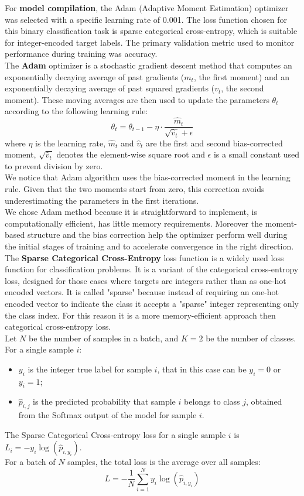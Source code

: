 \documentclass[10pt]{article}
\begin{document}
For \textbf{model compilation}, the Adam (Adaptive Moment Estimation) optimizer was selected with a specific learning rate of 0.001. The loss function chosen for this binary classification task is sparse categorical cross-entropy, which is suitable for integer-encoded target labels. The primary validation metric used to monitor performance during training was accuracy. \\

The \textbf{Adam} optimizer is a stochastic gradient descent method that computes an exponentially decaying average of past gradients ($m_t$, the first moment) and an exponentially decaying average of past squared gradients ($v_t$, the second moment). These moving averages are then used to update the parameters $\theta_t$ according to the following learning rule: 
$$\theta_t = \theta_{t-1} - \eta \cdot \frac{\hat{m}_t}{\sqrt{\hat{v}_t} + \epsilon}$$
where $\eta$ is the learning rate, $\hat{m}_t$ and $\hat{v}_t$ are the first and second bias-corrected moment, $\sqrt{\hat{v}_t}$ denotes the element-wise square root and $\epsilon$ is a small constant used to prevent division by zero. \\
We notice that Adam algorithm uses the bias-corrected moment in the learning rule. Given that the two moments start from zero, this correction avoids underestimating the parameters in the first iterations.\\
We chose Adam method because it is straightforward to implement, is computationally efficient, has little memory requirements. Moreover the moment-based structure and the bias correction help the optimizer perform well during the initial stages of training and to accelerate convergence in the right direction. \\

The \textbf{Sparse Categorical Cross-Entropy} loss function is a widely used loss function for classification problems. It is a variant of the categorical cross-entropy loss, designed for those cases where targets are integers rather than as one-hot encoded vectors. It is called "sparse" because instead of requiring an one-hot encoded vector to indicate the class it accepts a "sparse" integer representing only the class index. For this reason it is a more memory-efficient approach then categorical cross-entropy loss. \\
Let $N$ be the number of samples in a batch, and $K = 2$ be the number of classes.
For a single sample $i$:
\begin{itemize}
    \item $y_i$ is the integer true label for sample $i$, that in this case can be $y_i = 0$ or $y_i = 1$;
    \item $\hat{p}_{i, j}$ is the predicted probability that sample $i$ belongs to class $j$, obtained from the Softmax output of the model for sample $i$.
\end{itemize}
The Sparse Categorical Cross-entropy loss for a single sample $i$ is $L_i = - y_i \log(\hat{p}_{i, y_i})$. \\
For a batch of $N$ samples, the total loss is the average over all samples:
$$L = - \frac{1}{N} \sum_{i=1}^{N} y_i \log(\hat{p}_{i, y_i})$$
\end{document}
